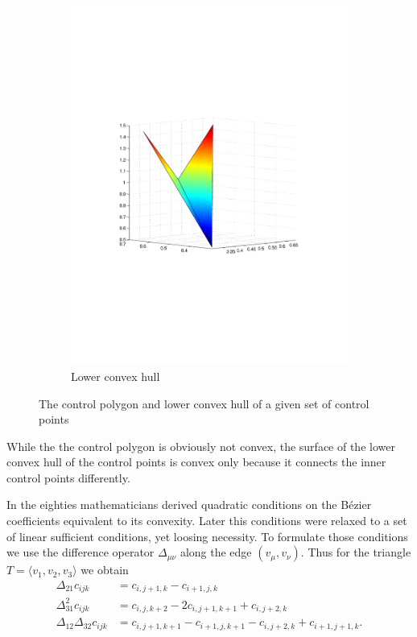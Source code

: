 \begin{figure}[h]
\begin{subfigure}[b]{.5\textwidth}
	\includegraphics[trim=3cm 8cm 3cm 8cm, width=1.\textwidth]{convex_hull2.pdf}
	\caption{Lower convex hull}
\end{subfigure}
\caption{The control polygon and lower convex hull of a given set of control points}
\label{fig: diff connectivity}
\end{figure}
While the the control polygon is obviously not convex, the surface of the lower convex hull of the control points is convex only because it connects the inner control points differently.

In the eighties mathematicians derived quadratic conditions on the B\'ezier coefficients equivalent to its convexity. Later this conditions were relaxed to a set of linear sufficient conditions, yet loosing necessity. To formulate those conditions we use the difference operator $\Delta_{\mu \nu}$ along the edge $(v_\mu, v_\nu)$. 
Thus for the triangle $T=\langle v_1, v_2,v_3 \rangle$ 
we obtain
	\begin{align*}
		\Delta_{21} c_{ijk} &= c_{i,j+1,k} -c_{i+1, j,k}  \\
		\Delta_{31}^2 c_{ijk} &= c_{i,j,k+2} -2c_{i, j+1,k+1} +c_{i, j+2,k} \\
		\Delta_{12} \Delta_{32} c_{ijk} &= c_{i,j+1,k+1} -c_{i+1, j,k+1} - c_{i,j+2,k} +c_{i+1, j+1,k}.
	\end{align*}
 
